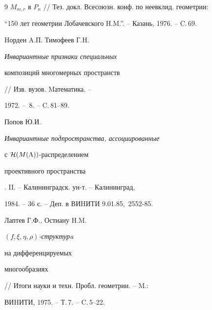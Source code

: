\begin{thebibliography}{9}
{$M_{m,r}$ в $P_n$} // Тез. докл. Всесоюзн. конф. по неевклид. геометрии:


``150 лет геометрии Лобачевского H.M.''. -- Казань, 1976. -- C.\,69.




Hорден A.П. Тимофеев Г.H. {\em Инвариантные признаки специальных


композиций многомерных пространств} // Изв. вузов. Mатематика. --


1972. -- \No\,8. -- C.\,81--89.




Попов Ю.И. {\em Инвариантные подпространства, ассоциированные


с ${\cal H}(M(\Lambda))$-распределением


проективного пространства}. II. -- Калининградск. ун-т. -- Калининград,


1984. -- 36 с. -- Деп. в ВИHИТИ 9.01.85, \No\,2552-85.




Лаптев Г.Ф., Остиану H.M. {\em $(f, \xi, \eta, \rho)$-структурa


на дифференцируемых


многообразиях} // Итоги науки и техн. Пробл. геометрии. -- M.:


ВИHИТИ, 1975. -- Т.\,7. -- C.\,5--22.





\end{thebibliography}





\vskip 2cm












\label{end}





